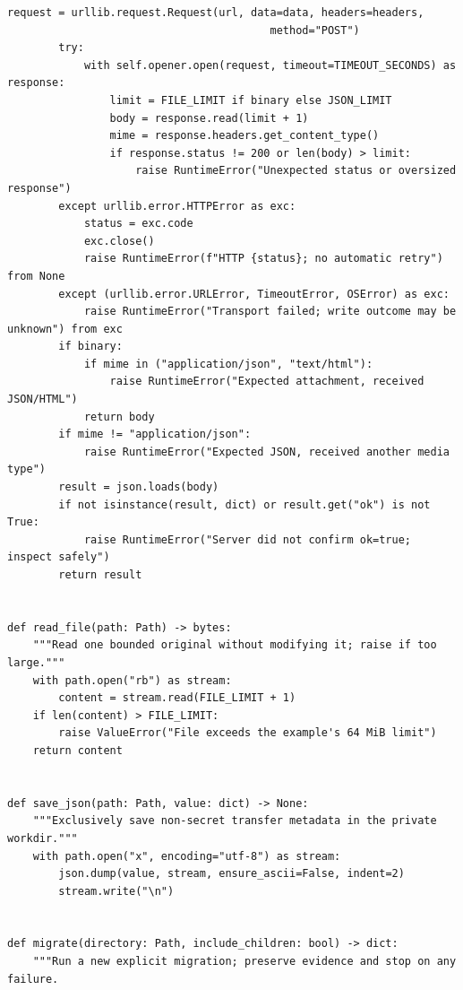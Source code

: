 \documentclass[11pt,a4paper]{article}
\begin{document}
\begin{lstlisting}[language={}]
        request = urllib.request.Request(url, data=data, headers=headers,
                                         method="POST")
        try:
            with self.opener.open(request, timeout=TIMEOUT_SECONDS) as response:
                limit = FILE_LIMIT if binary else JSON_LIMIT
                body = response.read(limit + 1)
                mime = response.headers.get_content_type()
                if response.status != 200 or len(body) > limit:
                    raise RuntimeError("Unexpected status or oversized response")
        except urllib.error.HTTPError as exc:
            status = exc.code
            exc.close()
            raise RuntimeError(f"HTTP {status}; no automatic retry") from None
        except (urllib.error.URLError, TimeoutError, OSError) as exc:
            raise RuntimeError("Transport failed; write outcome may be unknown") from exc
        if binary:
            if mime in ("application/json", "text/html"):
                raise RuntimeError("Expected attachment, received JSON/HTML")
            return body
        if mime != "application/json":
            raise RuntimeError("Expected JSON, received another media type")
        result = json.loads(body)
        if not isinstance(result, dict) or result.get("ok") is not True:
            raise RuntimeError("Server did not confirm ok=true; inspect safely")
        return result


def read_file(path: Path) -> bytes:
    """Read one bounded original without modifying it; raise if too large."""
    with path.open("rb") as stream:
        content = stream.read(FILE_LIMIT + 1)
    if len(content) > FILE_LIMIT:
        raise ValueError("File exceeds the example's 64 MiB limit")
    return content


def save_json(path: Path, value: dict) -> None:
    """Exclusively save non-secret transfer metadata in the private workdir."""
    with path.open("x", encoding="utf-8") as stream:
        json.dump(value, stream, ensure_ascii=False, indent=2)
        stream.write("\n")


def migrate(directory: Path, include_children: bool) -> dict:
    """Run a new explicit migration; preserve evidence and stop on any failure.


\end{lstlisting}
\end{document}
